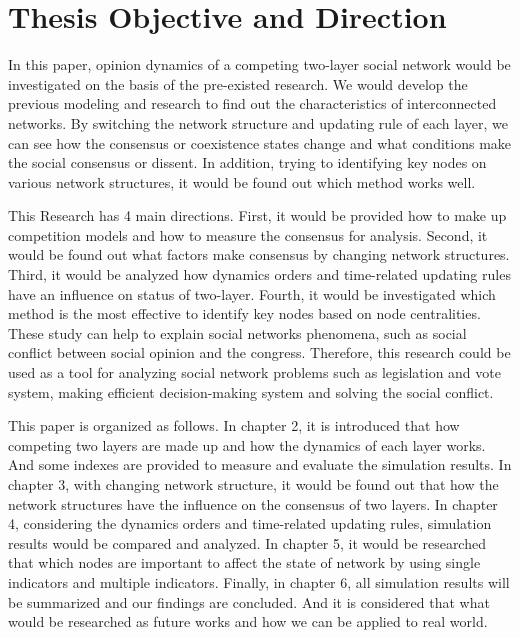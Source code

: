 \section{Thesis Objective and Direction}
In this paper, opinion dynamics of a competing two-layer social network would be investigated on the basis of the pre-existed research\parencite{alvarez2016, gomez2015, diep2017, rocca2014}. We would develop the previous modeling and research to find out the characteristics of interconnected networks. By switching the network structure and updating rule of each layer, we can see how the consensus or coexistence states change and what conditions make the social consensus or dissent. In addition, trying to identifying key nodes on various network structures, it would be found out which method works well.  

This Research has 4 main directions. First, it would be provided how to make up competition models and how to measure the consensus for analysis. Second, it would be found out what factors make consensus by changing network structures. Third, it would be analyzed how dynamics orders and time-related updating rules have an influence on status of two-layer. Fourth, it would be investigated which method is the most effective to identify key nodes based on node centralities. These study can help to explain social networks phenomena, such as social conflict between social opinion and the congress. Therefore, this research could be used as a tool for analyzing social network problems such as legislation and vote system, making efficient decision-making system and solving the social conflict. 

This paper is organized as follows. In chapter 2, it is introduced that how competing two layers are made up and how the dynamics of each layer works. And some indexes are provided to measure and evaluate the simulation results. In chapter 3, with changing network structure, it would be found out that how the network structures have the influence on the consensus of two layers. In chapter 4, considering the dynamics orders and time-related updating rules, simulation results would be compared and analyzed. In chapter 5, it would be researched that which nodes are important to affect the state of network by using single indicators and multiple indicators. Finally, in chapter 6, all simulation results will be summarized and our findings are concluded. And it is considered that what would be researched as future works and how we can be applied to real world. 


